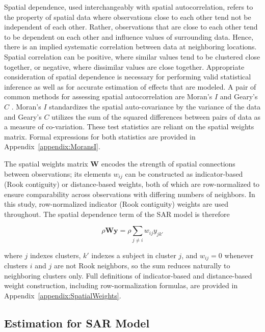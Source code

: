 \documentclass{article}[11pt]
\begin{document}
Spatial dependence, used interchangeably with spatial autocorrelation, refers to the property of spatial data where observations close to each other tend not be independent of each other. Rather, observations that are close to each other tend to be dependent on each other and influence values of surrounding data. Hence, there is an implied systematic correlation between data at neighboring locations. Spatial correlation can be positive, where similar values tend to be clustered close together, or negative, where dissimilar values are close together. Appropriate consideration of spatial dependence is necessary for performing valid statistical inference as well as for accurate estimation of effects that are modeled. A pair of common methods for assessing spatial autocorrelation are Moran's $\textit{I}$ \cite{moran_interpretation_1948}\cite{moran_notes_1950} and Geary's $\textit{C}$ \cite{geary_contiguity_1954}\cite{waller_applied_2004}. Moran's $\textit{I}$ standardizes the spatial auto-covariance by the variance of the data and Geary's $\textit{C}$ utilizes the sum of the squared differences between pairs of data as a measure of co-variation. These test statistics are reliant on the spatial weights matrix. Formal expressions for both statistics are provided in Appendix~\ref{appendix:MoransI}.

The spatial weights matrix $\mathbf{W}$ encodes the strength of spatial connections between observations; its elements $w_{ij}$ can be constructed as indicator-based (Rook contiguity) or distance-based weights, both of which are row-normalized to ensure comparability across observations with differing numbers of neighbors. In this study, row-normalized indicator (Rook contiguity) weights are used throughout. The spatial dependence term of the SAR model is therefore

\begin{equation}\label{Equation:SpatialDepTerm}
    \rho\mathbf{Wy} = \rho\sum_{j \neq i}w_{ij}y_{jk'}
\end{equation}

where $j$ indexes clusters, $k'$ indexes a subject in cluster $j$, and $w_{ij} = 0$ whenever clusters $i$ and $j$ are not Rook neighbors, so the sum reduces naturally to neighboring clusters only. Full definitions of indicator-based and distance-based weight construction, including row-normalization formulas, are provided in Appendix~\ref{appendix:SpatialWeights}.

\subsection{Estimation for SAR Model}
\end{document}
